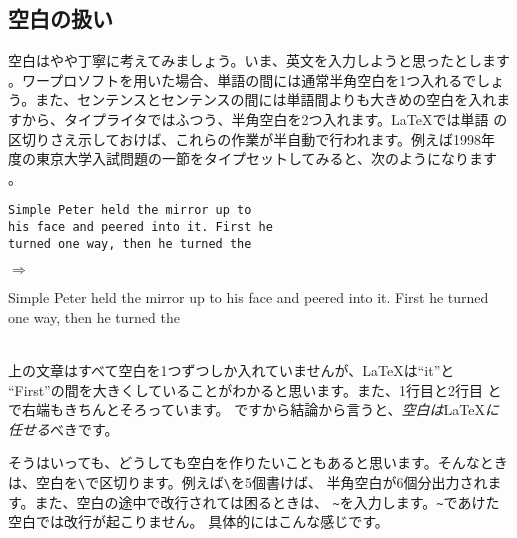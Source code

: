 \subsection{空白の扱い}
空白はやや丁寧に考えてみましょう。いま、英文を入力しようと思ったとします
。ワープロソフトを用いた場合、単語の間には通常半角空白を1つ入れるでしょ
う。また、センテンスとセンテンスの間には単語間よりも大きめの空白を入れま
すから、タイプライタではふつう、半角空白を2つ入れます。{\LaTeX}では単語
の区切りさえ示しておけば、これらの作業が半自動で行われます。例えば1998年
度の東京大学入試問題の一節をタイプセットしてみると、次のようになります
。\\
\begin{minipage}[c]{.50\textwidth}
\begin{screen}
\small
\begin{verbatim}
Simple Peter held the mirror up to
his face and peered into it. First he
turned one way, then he turned the
\end{verbatim}
\end{screen}
\end{minipage}%
$\Rightarrow$
\begin{minipage}{.45\textwidth}
\begin{shadebox}
Simple Peter held the mirror up to
his face and peered into it. First he
turned one way, then he turned the
\end{shadebox}
\end{minipage}
\vspace*{1mm}\\
上の文章はすべて空白を1つずつしか入れていませんが、{\LaTeX}は``it''と
``First''の間を大きくしていることがわかると思います。また、1行目と2行目
とで右端もきちんとそろっています。
ですから結論から言うと、\emph{空白は}{\LaTeX}\emph{に任せる}べきです。

そうはいっても、どうしても空白を作りたいこともあると思います。そんなとき
は、空白を\verb|\|で区切ります。例えば\verb|\|を5個書けば、
半角空白が6個分出力されます。また、空白の途中で改行されては困るときは、
\verb|~|を入力します。\verb|~|であけた空白では改行が起こりません。
具体的にはこんな感じです。\\

